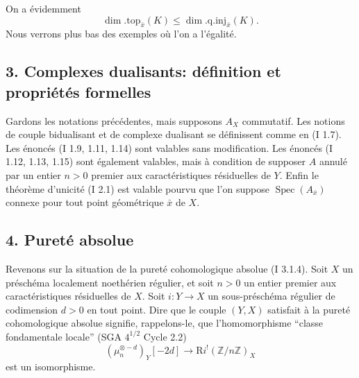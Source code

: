 \documentclass[11pt]{article}
\DeclareMathOperator{\Spec}{Spec}
\newcommand{\R}{\mathrm{R}}\newcommand{\RHomCore}{\mathrm{RHom}}
\newcommand{\Z}{\mathbb{Z}}
\providecommand{\R}{\mathrm R}
\providecommand{\Z}{\mathbb Z}
\providecommand{\Spec}{\operatorname{Spec}}
\providecommand{\Spec}{\operatorname{Spec}}
\providecommand{\Spec}{\operatorname{Spec}}
\providecommand{\Spec}{\operatorname{Spec}}
\begin{document}
On a évidemment
\[
        \dim.\mathrm{top}_{\bar{x}}(K)\leq \dim.\mathrm{q.inj}_{\bar{x}}(K).
\]
Nous verrons plus bas des exemples où l'on a l'égalité.

\subsection*{3. Complexes dualisants: définition et propriétés formelles}

Gardons les notations précédentes, mais supposons $A_X$ commutatif. Les notions de couple bidualisant et de complexe dualisant se définissent comme en (I 1.7). Les énoncés (I 1.9, 1.11, 1.14) sont valables sans modification. Les énoncés (I 1.12, 1.13, 1.15) sont également valables, mais à condition de supposer $A$ annulé par un entier $n>0$ premier aux caractéristiques résiduelles de $Y$. Enfin le théorème d'unicité (I 2.1) est valable pourvu que l'on suppose $\Spec(A_{\bar{x}})$ connexe pour tout point géométrique $\bar{x}$ de $X$.

\subsection*{4. Pureté absolue}

Revenons sur la situation de la pureté cohomologique absolue (I 3.1.4). Soit $X$ un préschéma localement noethérien régulier, et soit $n>0$ un entier premier aux caractéristiques résiduelles de $X$. Soit $i:Y\to X$ un sous-préschéma régulier de codimension $d>0$ en tout point. Dire que le couple $(Y,X)$ satisfait à la pureté cohomologique absolue signifie, rappelons-le, que l'homomorphisme ``classe fondamentale locale'' (SGA $4^{1/2}$ Cycle 2.2)
\begin{equation}\tag{4.1}
        (\mu_n^{\otimes -d})_Y[-2d]\longrightarrow \R i^!(\Z/n\Z)_X
\end{equation}
est un isomorphisme.
\end{document}
